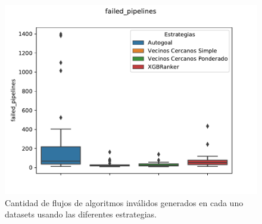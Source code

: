 \begin{figure}[H]
\centering
\includegraphics[scale=.75]{Figures/failed-pipelines.pdf}
\caption{Cantidad de flujos de algoritmos inválidos generados en cada uno datasets usando las diferentes estrategias.}
\label{fig:failedpipelines}
\end{figure}

%

